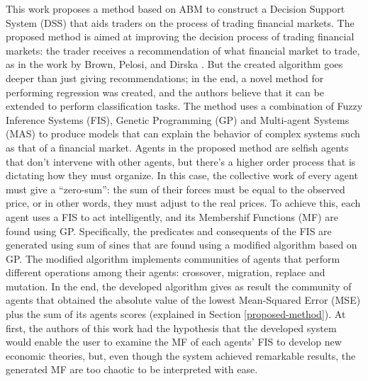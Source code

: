 \documentclass[12pt,journal,draftcls,onecolumn]{IEEEtran}
\begin{document}
This work proposes a method based on ABM to construct a Decision Support System (DSS) that aids traders on the process of trading financial markets. 
The proposed method is aimed at improving the decision process of trading financial markets: the trader receives a recommendation of what financial market to trade, as in the work by Brown, Pelosi, and Dirska \cite{brown2013dynamic}. But the created algorithm goes deeper than just giving recommendations; in the end, a novel method for performing regression was created, and the authors believe that it can be extended to perform classification tasks. 
The method uses a combination of Fuzzy Inference Systems (FIS), Genetic Programming (GP) \cite{poli2008field} \cite{Koza1992} and Multi-agent Systems (MAS) \cite{Shoham2009} to produce models that can explain the behavior of complex systems such as that of a financial market. %
Agents in the proposed method are selfish agents that don't intervene with other agents, but there's a higher order process that is dictating how they must organize. In this case, the collective work of every agent must give a ``zero-sum'': the sum of their forces must be equal to the observed price, or in other words, they must adjust to the real prices. To achieve this, each agent uses a FIS to act intelligently, and its Membershif Functions (MF) are found using GP. Specifically, the predicates and consequents of the FIS are generated using sum of sines that are found using a modified algorithm based on GP. The modified algorithm implements communities of agents that perform different operations among their agents: crossover, migration, replace and mutation. In the end, the developed algorithm gives as result the community of agents that obtained the absolute value of the lowest Mean-Squared Error (MSE) plus the sum of its agents scores (explained in Section \ref{proposed-method}). At first, the authors of this work had the hypothesis that the developed system would enable the user to examine the MF of each agents' FIS to develop new economic theories, but, even though the system achieved remarkable results, the generated MF are too chaotic to be interpreted with ease.
\end{document}
